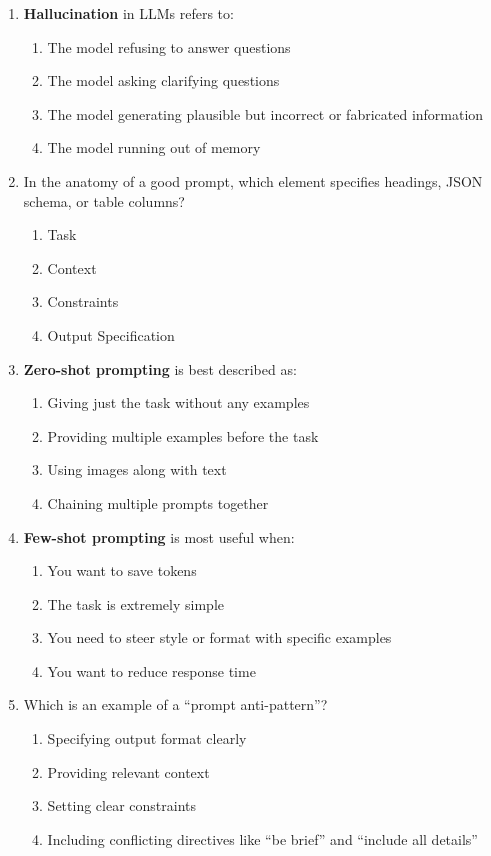 \documentclass[11pt]{article}
\begin{document}
\begin{enumerate}
\item \textbf{Hallucination} in LLMs refers to:
\begin{enumerate}[label=\Alph*)]
    \item The model refusing to answer questions
    \item The model asking clarifying questions
    \item The model generating plausible but incorrect or fabricated information
    \item The model running out of memory
\end{enumerate}

\item In the anatomy of a good prompt, which element specifies headings, JSON schema, or table columns?
\begin{enumerate}[label=\Alph*)]
    \item Task
    \item Context
    \item Constraints
    \item Output Specification
\end{enumerate}

\item \textbf{Zero-shot prompting} is best described as:
\begin{enumerate}[label=\Alph*)]
    \item Giving just the task without any examples
    \item Providing multiple examples before the task
    \item Using images along with text
    \item Chaining multiple prompts together
\end{enumerate}

\item \textbf{Few-shot prompting} is most useful when:
\begin{enumerate}[label=\Alph*)]
    \item You want to save tokens
    \item The task is extremely simple
    \item You need to steer style or format with specific examples
    \item You want to reduce response time
\end{enumerate}

\item Which is an example of a ``prompt anti-pattern''?
\begin{enumerate}[label=\Alph*)]
    \item Specifying output format clearly
    \item Providing relevant context
    \item Setting clear constraints
    \item Including conflicting directives like ``be brief'' and ``include all details''
\end{enumerate}


\end{enumerate}
\end{document}
